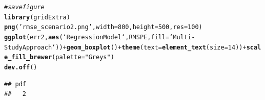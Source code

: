 \documentclass{article}\usepackage[]{graphicx}\usepackage[]{color}
\makeatletter
\newcommand{\hlnum}[1]{\textcolor[rgb]{0.686,0.059,0.569}{#1}}%
\newcommand{\hlstr}[1]{\textcolor[rgb]{0.192,0.494,0.8}{#1}}%
\newcommand{\hlcom}[1]{\textcolor[rgb]{0.678,0.584,0.686}{\textit{#1}}}%
\newcommand{\hlopt}[1]{\textcolor[rgb]{0,0,0}{#1}}%
\newcommand{\hlstd}[1]{\textcolor[rgb]{0.345,0.345,0.345}{#1}}%
\newcommand{\hlkwc}[1]{\textcolor[rgb]{0.333,0.667,0.333}{#1}}%
\newcommand{\hlkwd}[1]{\textcolor[rgb]{0.737,0.353,0.396}{\textbf{#1}}}%
\newenvironment{kframe}{%
 \def\at@end@of@kframe{}%
 \ifinner\ifhmode%
  \def\at@end@of@kframe{\end{minipage}}%
  \begin{minipage}{\columnwidth}%
 \fi\fi%
 \def\FrameCommand##1{\hskip\@totalleftmargin \hskip-\fboxsep
 \colorbox{shadecolor}{##1}\hskip-\fboxsep
     \hskip-\linewidth \hskip-\@totalleftmargin \hskip\columnwidth}%
 \MakeFramed {\advance\hsize-\width
   \@totalleftmargin\z@ \linewidth\hsize
   \@setminipage}}%
 {\par\unskip\endMakeFramed%
 \at@end@of@kframe}
\newenvironment{knitrout}{}{} %
\makeatother
\begin{document}
\begin{knitrout}
{}


\begin{kframe}\begin{alltt}
\hlcom{# save figure}
\hlkwd{library}\hlstd{(gridExtra)}
\hlkwd{png}\hlstd{(}\hlstr{'rmse_scenario2.png'}\hlstd{,} \hlkwc{width}\hlstd{=}\hlnum{800}\hlstd{,} \hlkwc{height}\hlstd{=}\hlnum{500}\hlstd{,} \hlkwc{res}\hlstd{=}\hlnum{100}\hlstd{)}
\hlkwd{ggplot}\hlstd{(err2,} \hlkwd{aes}\hlstd{(`Regression Model`, RMSPE,} \hlkwc{fill}\hlstd{=`Multi-Study Approach`))} \hlopt{+} \hlkwd{geom_boxplot}\hlstd{()} \hlopt{+} \hlkwd{theme}\hlstd{(}\hlkwc{text} \hlstd{=} \hlkwd{element_text}\hlstd{(}\hlkwc{size} \hlstd{=} \hlnum{14}\hlstd{))} \hlopt{+} \hlkwd{scale_fill_brewer}\hlstd{(}\hlkwc{palette}\hlstd{=}\hlstr{"Greys"}\hlstd{)}
\hlkwd{dev.off}\hlstd{()}
\end{alltt}
\begin{verbatim}
## pdf 
##   2
\end{verbatim}
\end{kframe}
\end{knitrout}
\end{document}
